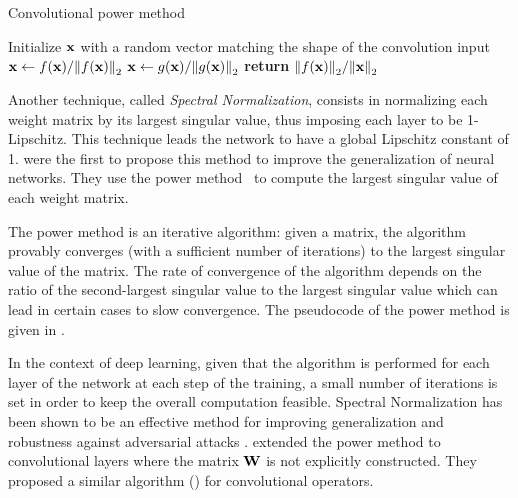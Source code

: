 \begin{algorithm}[ht]
  \caption{Convolutional power method \cite{farnia2018generalizable}}
  \begin{algorithmic}[1]
    \State Initialize $\mathbf{x}$ with a random vector matching the shape of the convolution input
      \State $\mathbf{x} \gets f(\mathbf{x}) / \norm{f(\mathbf{x})}_2 $
      \State $\mathbf{x} \gets g(\mathbf{x}) / \norm{g(\mathbf{x})}_2$
    \EndFor
    \State \textbf{return} $\norm{f(\mathbf{x})}_2 / \norm{\mathbf{x}}_2$
  \end{algorithmic}
  \label{algorithm:ch3-power_method_generic}
\end{algorithm}


Another technique, called \emph{Spectral Normalization}, consists in normalizing each weight matrix by its largest singular value, thus imposing each layer to be 1-Lipschitz.
This technique leads the network to have a global Lipschitz constant of 1.
\citet{yoshida2017spectral} were the first to propose this method to improve the generalization of neural networks.
They use the power method~\cite{golub2000eigenvalue} to compute the largest singular value of each weight matrix.

The power method is an iterative algorithm: given a matrix, the algorithm provably converges (with a sufficient number of iterations) to the largest singular value of the matrix.
The rate of convergence of the algorithm depends on the ratio of the second-largest singular value to the largest singular value which can lead in certain cases to slow convergence.
The pseudocode of the power method is given in .

In the context of deep learning, given that the algorithm is performed for each layer of the network at each step of the training, a small number of iterations is set in order to keep the overall computation feasible.
Spectral Normalization has been shown to be an effective method for improving generalization and robustness against adversarial attacks \cite{miyato2018spectral,gouk2018regularisation,farnia2018generalizable}.
\citet{farnia2018generalizable,ryu2019plug} extended the power method to convolutional layers where the matrix $\mathbf{W}$ is not explicitly constructed.
They proposed a similar algorithm () for convolutional operators.

